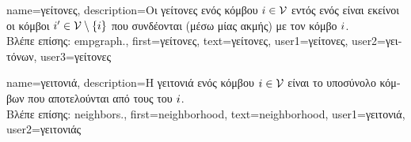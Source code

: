 {name={\foreignlanguage{greek}{γείτονες}},
	description={\foreignlanguage{greek}{Οι γείτονες ενός κόμβου} 
		$i \in \mathcal{V}$ \foreignlanguage{greek}{εντός ενός}  
		\foreignlanguage{greek}{είναι εκείνοι οι κόμβοι $i' \in \mathcal{V} \setminus \{ i\}$ 
		που συνδέονται (μέσω μίας ακμής) με τον κόμβο} $i$.\\
		\foreignlanguage{greek}{Βλέπε επίσης:} \gls{empgraph}.},
	first={\foreignlanguage{greek}{γείτονες}},
	text={\foreignlanguage{greek}{γείτονες}},
	user1={\foreignlanguage{greek}{γείτονες}}, %
   	user2={\foreignlanguage{greek}{γειτόνων}}, %
	user3={\foreignlanguage{greek}{γείτονες}} %
}

{name={\foreignlanguage{greek}{γειτονιά}},
	description={\foreignlanguage{greek}{Η γειτονιά ενός κόμβου} 
		$i \in \mathcal{V}$ \foreignlanguage{greek}{είναι το υποσύνολο κόμβων που αποτελούνται από τους} 
		 \foreignlanguage{greek}{του} $i$.\\
		\foreignlanguage{greek}{Βλέπε επίσης:} \gls{neighbors}.},
	first={neighborhood},
	text={neighborhood},
	user1={\foreignlanguage{greek}{γειτονιά}}, %
   	user2={\foreignlanguage{greek}{γειτονιάς}} %
}

